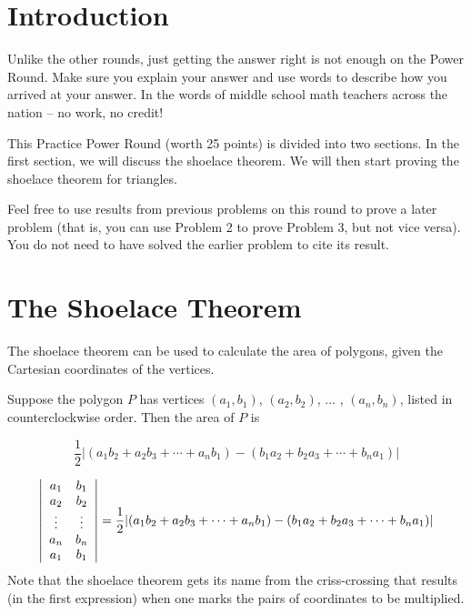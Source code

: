 \documentclass[11pt]{article}
\begin{document}
\section{Introduction}

Unlike the other rounds, just getting the answer right is not enough on the Power Round. Make sure you explain your answer and use words to describe how you arrived at your answer. In the words of middle school math teachers across the nation -- no work, no credit!

This Practice Power Round (worth 25 points) is divided into two sections. In the first section,  we will discuss the shoelace theorem. We will then start proving the shoelace theorem for triangles.

Feel free to use results from previous problems on this round to prove a later problem (that is, you can use Problem 2 to prove Problem 3, but not vice versa). You do not need to have solved the earlier problem to cite its result.

\section{The Shoelace Theorem}
\noindent The shoelace theorem can be used to calculate the area of polygons, given the Cartesian coordinates of the vertices. 

\begin{theorem} Suppose the polygon $P$ has vertices $(a_1, b_1)$, $(a_2, b_2)$, ... , $(a_n, b_n)$, listed in counterclockwise order. Then the area of $P$ is

\[\dfrac{1}{2} |(a_1b_2 + a_2b_3 + \cdots + a_nb_1) - (b_1a_2 + b_2a_3 + \cdots + b_na_1)|\]
\end{theorem}
\begin{comment}
The Shoelace Theorem gets its name because if one lists the coordinates in a column, 
\begin{align*} 
(a_1 &, b_1) \\ 
(a_2 &, b_2) \\ 
& \vdots \\ 
(a_n &, b_n) \\ 
(a_1 &, b_1) \\ 
\end{align*} 
and marks the pairs of coordinates to be multiplied, the resulting image looks like laced-up shoes.
\end{comment}

\begin{definition}
\[\left|\begin{array}{c c}a_1  & b_1 \\ a_2 &  b_2 \\ \vdots & \vdots \\ a_n & b_n \\ a_1 & b_1 \\ \end{array}\right| = \dfrac{1}{2} |(a_1b_2 + a_2b_3 + \cdots + a_nb_1) - (b_1a_2 + b_2a_3 + \cdots + b_na_1)|\]
Note that the shoelace theorem gets its name from the criss-crossing that results (in the first expression) when one marks the pairs of coordinates to be multiplied.
\end{definition}
\end{document}
